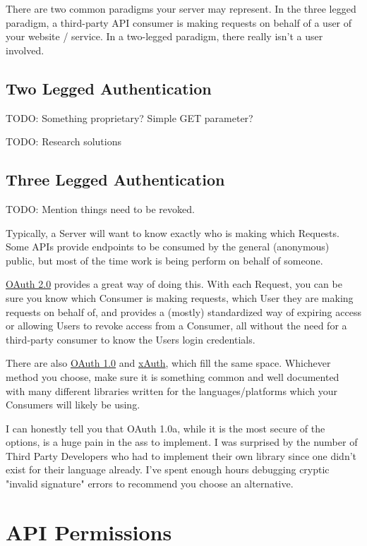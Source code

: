 \documentclass{book}
\begin{document}
There are two common paradigms your server may represent. In the three legged paradigm, a third-party API consumer is making requests on behalf of a user of your website / service. In a two-legged paradigm, there really isn't a user involved.

\section{Two Legged Authentication}

TODO: Something proprietary? Simple GET parameter?

TODO: Research solutions

\section{Three Legged Authentication}

TODO: Mention things need to be revoked.

Typically, a Server will want to know exactly who is making which Requests. Some APIs provide endpoints to be consumed by the general (anonymous) public, but most of the time work is being perform on behalf of someone.

\href{https://tools.ietf.org/html/rfc6749}{OAuth 2.0} provides a great way of doing this. With each Request, you can be sure you know which Consumer is making requests, which User they are making requests on behalf of, and provides a (mostly) standardized way of expiring access or allowing Users to revoke access from a Consumer, all without the need for a third-party consumer to know the Users login credentials.

There are also \href{http://tools.ietf.org/html/rfc5849}{OAuth 1.0} and \href{https://dev.twitter.com/docs/oauth/xauth}{xAuth}, which fill the same space. Whichever method you choose, make sure it is something common and well documented with many different libraries written for the languages/platforms which your Consumers will likely be using.

I can honestly tell you that OAuth 1.0a, while it is the most secure of the options, is a huge pain in the ass to implement. I was surprised by the number of Third Party Developers who had to implement their own library since one didn't exist for their language already. I've spent enough hours debugging cryptic "invalid signature" errors to recommend you choose an alternative.


\chapter{API Permissions}
\end{document}
